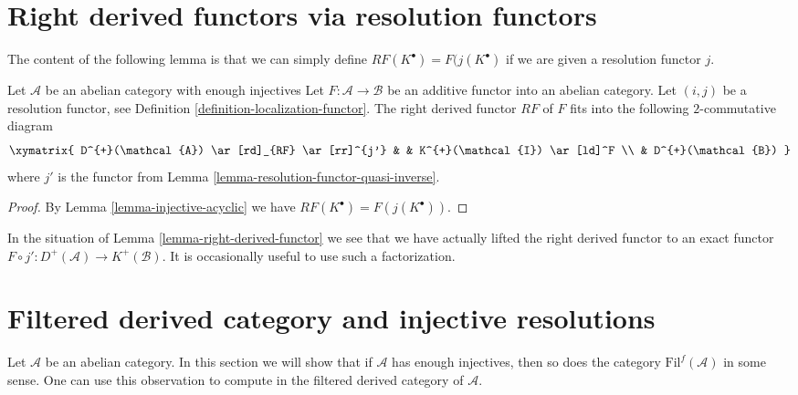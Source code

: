 \section{Right derived functors via resolution functors}
\label{section-right-derived-functor-via-resolutions}

\noindent
The content of the following lemma is that we can simply define
$RF(K^\bullet) = F(j(K^\bullet)$ if we are given a resolution functor $j$.

\begin{lemma}
\label{lemma-right-derived-functor}
Let $\mathcal{A}$ be an abelian category with enough injectives
Let $F : \mathcal{A} \to \mathcal{B}$ be an additive functor into
an abelian category. Let $(i, j)$ be a resolution functor, see
Definition \ref{definition-localization-functor}.
The right derived functor $RF$ of $F$ fits into the following
$2$-commutative diagram
$$
\xymatrix{
D^{+}(\mathcal{A}) \ar[rd]_{RF} \ar[rr]^{j'} & &
K^{+}(\mathcal{I}) \ar[ld]^F \\
& D^{+}(\mathcal{B})
}
$$
where $j'$ is the functor from
Lemma \ref{lemma-resolution-functor-quasi-inverse}.
\end{lemma}

\begin{proof}
By
Lemma \ref{lemma-injective-acyclic}
we have $RF(K^\bullet) = F(j(K^\bullet))$.
\end{proof}

\begin{remark}
\label{remark-right-derived-functor}
In the situation of
Lemma \ref{lemma-right-derived-functor}
we see that we have actually lifted the right derived
functor to an exact functor
$F \circ j' : D^{+}(\mathcal{A}) \to K^{+}(\mathcal{B})$.
It is occasionally useful to use such a factorization.
\end{remark}








\section{Filtered derived category and injective resolutions}
\label{section-filtered-derived}

\noindent
Let $\mathcal{A}$ be an abelian category. In this section we will show
that if $\mathcal{A}$ has enough injectives, then so does
the category $\text{Fil}^f(\mathcal{A})$ in some sense. One
can use this observation to compute in the filtered derived category
of $\mathcal{A}$.

